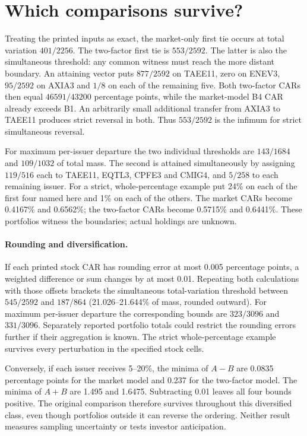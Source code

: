\documentclass[11pt]{article}
\begin{document}
\section{Which comparisons survive?}
Treating the printed inputs as exact, the market-only first tie occurs at total variation $401/2256$. The two-factor first tie is $553/2592$. The latter is also the simultaneous threshold: any common witness must reach the more distant boundary. An attaining vector puts $877/2592$ on TAEE11, zero on ENEV3, $95/2592$ on AXIA3 and $1/8$ on each of the remaining five. Both two-factor CARs then equal $46591/43200$ percentage points, while the market-model B4 CAR already exceeds B1. An arbitrarily small additional transfer from AXIA3 to TAEE11 produces strict reversal in both. Thus $553/2592$ is the infimum for strict simultaneous reversal.

For maximum per-issuer departure the two individual thresholds are $143/1684$ and $109/1032$ of total mass. The second is attained simultaneously by assigning $119/516$ each to TAEE11, EQTL3, CPFE3 and CMIG4, and $5/258$ to each remaining issuer. For a strict, whole-percentage example put 24\% on each of the first four named here and 1\% on each of the others. The market CARs become 0.4167\% and 0.6562\%; the two-factor CARs become 0.5715\% and 0.6441\%. These portfolios witness the boundaries; actual holdings are unknown.

\paragraph{Rounding and diversification.}
If each printed stock CAR has rounding error at most 0.005 percentage points, a weighted difference or sum changes by at most 0.01. Repeating both calculations with those offsets brackets the simultaneous total-variation threshold between $545/2592$ and $187/864$ (21.026--21.644\% of mass, rounded outward). For maximum per-issuer departure the corresponding bounds are $323/3096$ and $331/3096$. Separately reported portfolio totals could restrict the rounding errors further if their aggregation is known. The strict whole-percentage example survives every perturbation in the specified stock cells.

Conversely, if each issuer receives 5--20\%, the minima of $A-B$ are 0.0835 percentage points for the market model and 0.237 for the two-factor model. The minima of $A+B$ are 1.495 and 1.6475. Subtracting 0.01 leaves all four bounds positive. The original comparison therefore survives throughout this diversified class, even though portfolios outside it can reverse the ordering. Neither result measures sampling uncertainty or tests investor anticipation.
\end{document}
